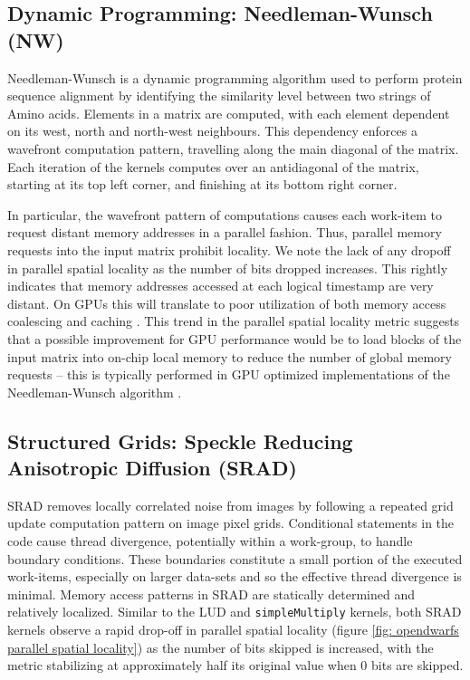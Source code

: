 \documentclass[review=false, sigchi]{acmart}
\begin{document}
	\subsection{Dynamic Programming: Needleman-Wunsch (NW)}
	
	Needleman-Wunsch is a dynamic programming algorithm used to perform protein sequence alignment by identifying the similarity level between two strings of Amino acids. Elements in a matrix are computed, with each element dependent on its west, north and north-west neighbours. This dependency enforces a wavefront computation pattern, travelling along the main diagonal of the matrix. Each iteration of the kernels computes over an antidiagonal of the matrix, starting at its top left corner, and finishing at its bottom right corner.
	
	In particular, the wavefront pattern of computations causes each work-item to request distant memory addresses in a parallel fashion. Thus, parallel memory requests into the input matrix prohibit locality. We note the lack of any dropoff in parallel spatial locality as the number of bits dropped increases. This rightly indicates that memory addresses accessed at each logical timestamp are very distant. On GPUs this will translate to poor utilization of both memory access coalescing and caching \cite{krommydas2016opendwarfs}. This trend in the parallel spatial locality metric suggests that a possible improvement for GPU performance would be to load blocks of the input matrix into on-chip local memory to reduce the number of global memory requests -- this is typically performed in GPU optimized implementations of the Needleman-Wunsch algorithm \cite{opendwarfs2020head}. 
	
	\subsection{Structured Grids: Speckle Reducing Anisotropic Diffusion (SRAD)}
	
	SRAD removes locally correlated noise from images by following a repeated grid update computation pattern on image pixel grids. 
	Conditional statements in the code cause thread divergence, potentially within a work-group, to handle boundary conditions. 
	These boundaries constitute a small portion of the executed work-items, especially on larger data-sets and so the effective thread divergence is minimal.
	Memory access patterns in SRAD are statically determined and relatively localized. 
	Similar to the LUD and \texttt{simpleMultiply} kernels, both SRAD kernels observe a rapid drop-off in parallel spatial locality (figure \ref{fig: opendwarfs parallel spatial locality}) as the number of bits skipped is increased, with the metric stabilizing at approximately half its original value when 0 bits are skipped.
	
\end{document}
